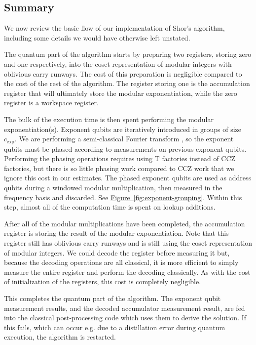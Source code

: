 \documentclass[superscriptaddress,notitlepage,longbibliography]{revtex4-1}
\theoremstyle{definition}
\theoremstyle{definition}
\newcommand{\fig}[1]{\hyperref[fig:#1]{Figure~\ref*{fig:#1}}}
\newcommand{\gexp}{{c_{\text{exp}}}}
\begin{document}
\subsection{Summary}

We now review the basic flow of our implementation of Shor's algorithm, including some details we would have otherwise left unstated.

The quantum part of the algorithm starts by preparing two registers, storing zero and one respectively, into the coset representation of modular integers with oblivious carry runways.
The cost of this preparation is negligible compared to the cost of the rest of the algorithm.
The register storing one is the accumulation register that will ultimately store the modular exponentiation, while the zero register is a workspace register.

The bulk of the execution time is then spent performing the modular exponentiation(s).
Exponent qubits are iteratively introduced in groups of size $\gexp$.
We are performing a semi-classical Fourier transform \cite{griffiths1996semiclassical}, so the exponent qubits must be phased according to measurements on previous exponent qubits.
Performing the phasing operations requires using T factories instead of CCZ factories, but there is so little phasing work compared to CCZ work that we ignore this cost in our estimates.
The phased exponent qubits are used as address qubits during a windowed modular multiplication, then measured in the frequency basis and discarded.
See \fig{exponent-grouping}.
Within this step, almost all of the computation time is spent on lookup additions.

After all of the modular multiplications have been completed, the accumulation register is storing the result of the modular exponentiation.
Note that this register still has oblivious carry runways and is still using the coset representation of modular integers.
We could decode the register before measuring it but, because the decoding operations are all classical, it is more efficient to simply measure the entire register and perform the decoding classically.
As with the cost of initialization of the registers, this cost is completely negligible.

This completes the quantum part of the algorithm.
The exponent qubit measurement results, and the decoded accumulator measurement result, are fed into the classical post-processing code which uses them to derive the solution.
If this fails, which can occur e.g. due to a distillation error during quantum execution, the algorithm is restarted.
\end{document}
